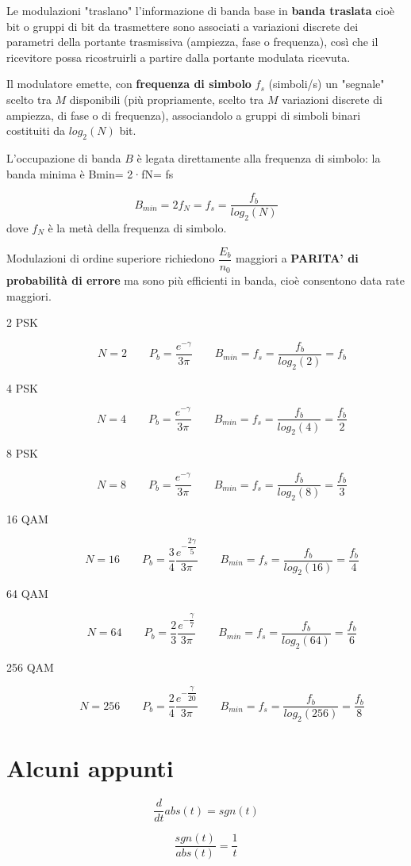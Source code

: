 \documentclass[10pt,a4paper]{article}
\begin{document}
Le modulazioni "traslano" l'informazione di banda base in \textbf{banda traslata} cioè bit o gruppi di bit da trasmettere sono associati a variazioni discrete dei parametri della portante trasmissiva (ampiezza, fase o frequenza), così che il ricevitore possa ricostruirli a partire dalla portante modulata ricevuta.

Il modulatore emette, con \textbf{frequenza di simbolo} $f_s$ (simboli/s) un "segnale" scelto tra $M$ disponibili (più propriamente, scelto tra $M$ variazioni discrete di ampiezza, di fase o di frequenza), associandolo a gruppi di simboli binari costituiti da $log_2(N)$ bit.

L'occupazione di banda $B$ è legata direttamente alla frequenza di simbolo: la banda minima è Bmin= 2·fN= fs 

\begin{equation}
B_{min} = 2f_N = f_s = \dfrac{f_b}{log_2(N)}
\end{equation}
dove $f_N$ è la metà della frequenza di simbolo.
 
Modulazioni di ordine superiore richiedono $\dfrac{E_b}{n_0}$ maggiori a \textbf{PARITA' di probabilità di errore} ma sono più efficienti in banda, cioè consentono data rate maggiori.

\begin{description}

\item[2 PSK] 
\[
N=2
\qquad
P_b = \dfrac{e^{-\gamma}}{3\pi} 
\qquad
B_{min} = f_s=\dfrac{f_b}{log_2 (2)} = f_b
\]

\item[4 PSK] 
\[
N=4
\qquad
P_b = \dfrac{e^{-\gamma}}{3\pi} 
\qquad
B_{min} = f_s=\dfrac{f_b}{log_2 (4)} = \dfrac{f_b}{2}
\]

\item[8 PSK] 
\[
N=8
\qquad
P_b = \dfrac{e^{-\gamma}}{3\pi} 
\qquad
B_{min} = f_s =\dfrac{f_b}{log_2 (8)} = \dfrac{f_b}{3}
\]


\item[16 QAM] 
\[
N=16
\qquad
P_b = \dfrac{3}{4}\dfrac{e^{-\dfrac{2\gamma}{5}}}{3\pi} 
\qquad
B_{min} = f_s =\dfrac{f_b}{log_2 (16)} = \dfrac{f_b}{4}
\]

\item[64 QAM] 
\[
N=64
\qquad
P_b = \dfrac{2}{3}\dfrac{e^{-\dfrac{\gamma}{7}}}{3\pi} 
\qquad
B_{min} = f_s =\dfrac{f_b}{log_2 (64)} = \dfrac{f_b}{6}
\]

\item[256 QAM] 
\[
N=256
\qquad
P_b = \dfrac{2}{4}\dfrac{e^{-\dfrac{\gamma}{20}}}{3\pi} 
\qquad
B_{min} = f_s =\dfrac{f_b}{log_2 (256)} = \dfrac{f_b}{8}
\]

\end{description}

\section{Alcuni appunti}

\[
\dfrac{d}{dt} abs(t) = sgn(t)
\]

\[
\dfrac{sgn(t)}{abs(t)} = \dfrac{1}{t}
\]
\end{document}
